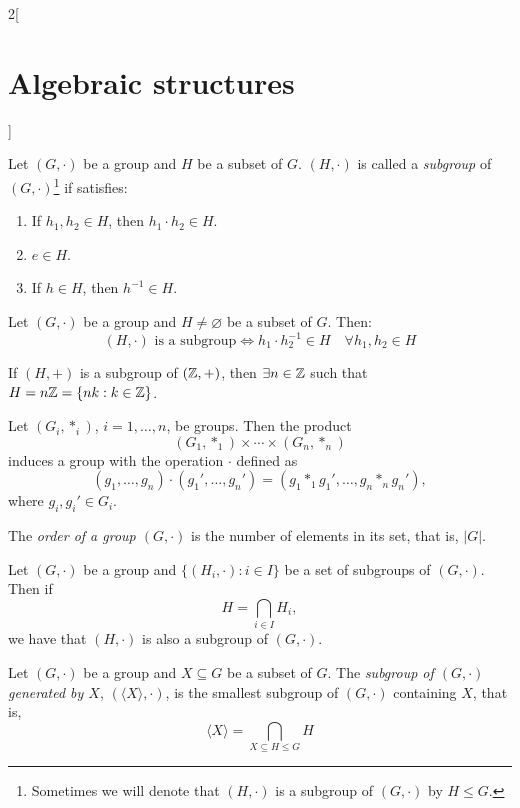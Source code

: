 \documentclass[../../../main.tex]{subfiles}
\begin{document}
\begin{multicols}{2}[\section{Algebraic structures}]
\begin{lemma}
\begin{enumerate}
    \end{enumerate}
  \end{lemma}
  \begin{definition}[Subgroup]
    Let $(G,\cdot)$ be a group and $H$ be a subset of $G$. $(H,\cdot)$ is called a \textit{subgroup} of $(G,\cdot)$\footnote{Sometimes we will denote that $(H,\cdot)$ is a subgroup of $(G,\cdot)$ by $H\leq G$.} if satisfies:
    \begin{enumerate}
      \item If $h_1,h_2\in H$, then $h_1\cdot h_2\in H$.
      \item $e\in H$.
      \item If $h\in H$, then $h^{-1}\in H$.
    \end{enumerate}
  \end{definition}
  \begin{prop}
    Let $(G,\cdot)$ be a group and $H\ne\varnothing$ be a subset of $G$. Then: $$(H,\cdot)\text{ is a subgroup}\iff h_1\cdot h_2^{-1}\in H\quad\forall h_1,h_2\in H$$
  \end{prop}
  \begin{prop}
    If $(H,+)$ is a subgroup of $(\mathbb{Z} ,+)$, then $\exists n\in\mathbb{Z} $ such that $H=n\mathbb{Z} =\{nk:k\in\mathbb{Z} \}$.
  \end{prop}
  \begin{prop}
    Let $(G_i,*_i)$, $i=1,\ldots, n$, be groups. Then the product $$(G_1,*_1)\times\cdots\times(G_n,*_n)$$ induces a group with the operation $\cdot$ defined as $$(g_1,\ldots,g_n)\cdot(g_1',\ldots,g_n')=(g_1*_1g_1',\ldots,g_n*_ng_n'),$$ where $g_i,g_i'\in G_i$.
  \end{prop}
  \begin{definition}
    The \textit{order of a group $(G,\cdot)$} is the number of elements in its set, that is, $|G|$.
  \end{definition}
  \begin{lemma}
    Let $(G,\cdot)$ be a group and $\{(H_i,\cdot):i\in I\}$ be a set of subgroups of $(G,\cdot)$. Then if $$H=\displaystyle\bigcap_{i\in I}H_i,$$ we have that $(H,\cdot)$ is also a subgroup of $(G,\cdot)$.
  \end{lemma}
  \begin{definition}
    Let $(G,\cdot)$ be a group and $X\subseteq G$ be a subset of $G$. The \textit{subgroup of $(G,\cdot)$ generated by $X$}, $(\langle X\rangle,\cdot)$, is the smallest subgroup of $(G,\cdot)$ containing $X$, that is, $$\langle X\rangle=\bigcap_{X\subseteq H\leq G}H$$
  \end{definition}

\end{multicols}
\end{document}
